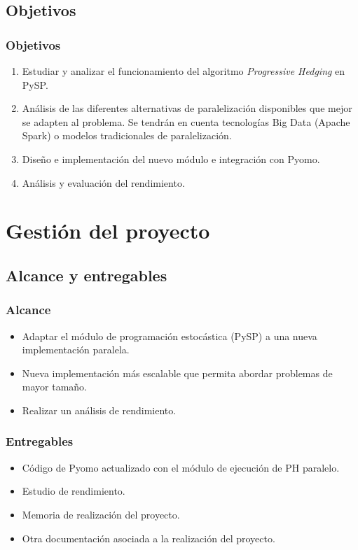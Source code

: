 \documentclass{beamer}
\begin{document}
\subsection{Objetivos}

\begin{frame}
    \frametitle{Objetivos}
    \begin{enumerate}
        \item Estudiar y analizar el funcionamiento del algoritmo \textit{Progressive Hedging} en PySP.
        \item Análisis de las diferentes alternativas de paralelización disponibles que mejor se adapten al problema. Se tendrán en cuenta tecnologías Big Data (Apache Spark) o modelos tradicionales de paralelización.
        \item Diseño e implementación del nuevo módulo e integración con Pyomo.
        \item Análisis y evaluación del rendimiento.
    \end{enumerate}
\end{frame}

\section{Gestión del proyecto}

\subsection{Alcance y entregables}

\begin{frame}
    \frametitle{Alcance}
    \begin{itemize}
        \item Adaptar el módulo de programación estocástica (PySP) a una nueva implementación paralela.
        \item Nueva implementación más escalable que permita abordar problemas de mayor tamaño.
        \item Realizar un análisis de rendimiento.
    \end{itemize}
\end{frame}

\begin{frame}
    \frametitle{Entregables}
    \begin{itemize}
        \item Código de Pyomo actualizado con el módulo de ejecución de PH paralelo.
        \item Estudio de rendimiento.
        \item Memoria de realización del proyecto.
        \item Otra documentación asociada a la realización del proyecto.
    \end{itemize}
\end{frame}
\end{document}
